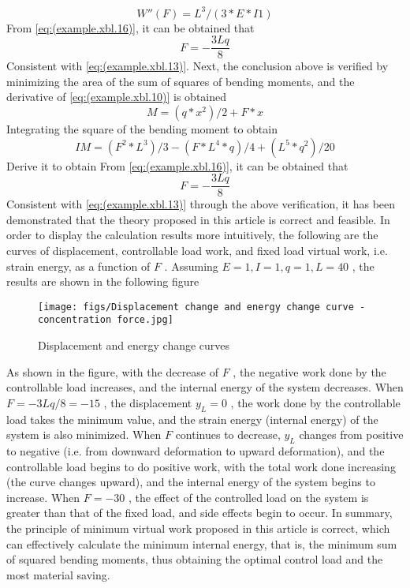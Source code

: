 \begin{equation}\label{eq:(example.xbl.16)}
W''(F)=L^3/(3*E*I1)
\end{equation}
From \ref{eq:(example.xbl.16)}, it can be obtained that
\begin{equation}\label{eq:(example.xbl.17)}
F=-\frac{3Lq}{8}
\end{equation}
Consistent with \ref{eq:(example.xbl.13)}.
Next, the conclusion above is verified by minimizing the area of the sum of squares of bending moments, and the derivative of \ref{eq:(example.xbl.10)} is obtained
\begin{equation}\label{eq:(example.xbl.15)}
M=(q*x^2)/2 + F*x
\end{equation}
Integrating the square of the bending moment to obtain
\begin{equation}\label{eq:(example.xbl.16)}
IM= (F^2*L^3)/3 - (F*L^4*q)/4 + (L^5*q^2)/20
\end{equation}
Derive it to obtain
From \ref{eq:(example.xbl.16)}, it can be obtained that
\begin{equation}\label{eq:(example.xbl.17)}
F=-\frac{3Lq}{8}
\end{equation}
Consistent with \ref{eq:(example.xbl.13)} through the above verification, it has been demonstrated that the theory proposed in this article is correct and feasible.
In order to display the calculation results more intuitively, the following are the curves of displacement, controllable load work, and fixed load virtual work, i.e. strain energy, as a function of $ F $ . Assuming $ E=1, I=1, q=1, L=40 $ , the results are shown in the following figure
\begin{figure}[h!] %
    \centering
    \texttt{[image: figs/Displacement change and energy change curve - concentration force.jpg]} 
    \caption{Displacement and energy change curves}
    \label{fig:jizhongli}
\end{figure}
As shown in the figure, with the decrease of $ F $ , the negative work done by the controllable load increases, and the internal energy of the system decreases. When $ F=- {3Lq}/{8}=-15 $ , the displacement $ y_L=0 $ , the work done by the controllable load takes the minimum value, and the strain energy (internal energy) of the system is also minimized. When $ F $ continues to decrease, $ y_L $ changes from positive to negative (i.e. from downward deformation to upward deformation), and the controllable load begins to do positive work, with the total work done increasing (the curve changes upward), and the internal energy of the system begins to increase. When $ F=-30 $ , the effect of the controlled load on the system is greater than that of the fixed load, and side effects begin to occur.
In summary, the principle of minimum virtual work proposed in this article is correct, which can effectively calculate the minimum internal energy, that is, the minimum sum of squared bending moments, thus obtaining the optimal control load and the most material saving.
